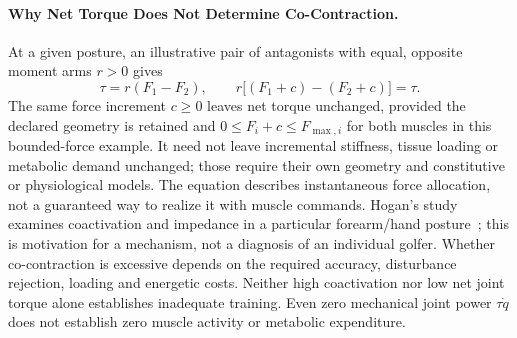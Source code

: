 
\paragraph{Why Net Torque Does Not Determine Co-Contraction.}
At a given posture, an illustrative pair of antagonists with equal, opposite moment arms $r>0$ gives
\begin{equation}
 \tau=r(F_1-F_2),\qquad
 r\big[(F_1+c)-(F_2+c)\big]=\tau.
\end{equation}
The same force increment $c\ge0$ leaves net torque unchanged, provided the declared geometry is retained and $0\le F_i+c\le F_{\max,i}$ for both muscles in this bounded-force example.
It need not leave incremental stiffness, tissue loading or metabolic demand unchanged; those require their own geometry and constitutive or physiological models.
The equation describes instantaneous force allocation, not a guaranteed way to realize it with muscle commands.
Hogan's study examines coactivation and impedance in a particular forearm/hand posture~\cite{Hogan1984}; this is motivation for a mechanism, not a diagnosis of an individual golfer.
Whether co-contraction is excessive depends on the required accuracy, disturbance rejection, loading and energetic costs.
Neither high coactivation nor low net joint torque alone establishes inadequate training.
Even zero mechanical joint power $\tau\dot q$ does not establish zero muscle activity or metabolic expenditure.


